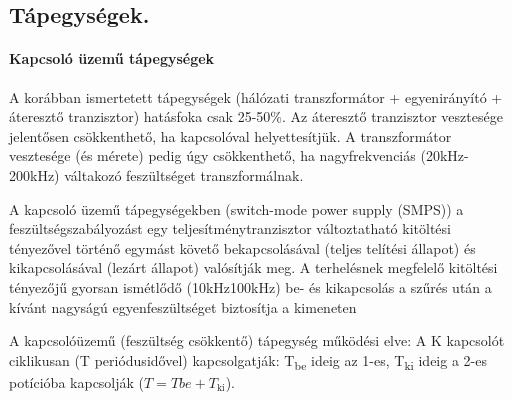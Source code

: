 \subsection{Tápegységek.}
\paragraph{Kapcsoló üzemű tápegységek} A korábban ismertetett tápegységek (hálózati transzformátor + egyenirányító + áteresztő tranzisztor) hatásfoka csak 25-50\%. Az áteresztő tranzisztor vesztesége jelentősen csökkenthető, ha kapcsolóval helyettesítjük. A transzformátor vesztesége (és mérete) pedig úgy csökkenthető, ha nagyfrekvenciás (20kHz-200kHz) váltakozó feszültséget transzformálnak.

A kapcsoló üzemű tápegységekben (switch-mode power supply (SMPS)) a feszültségszabályozást egy teljesítménytranzisztor változtatható kitöltési tényezővel történő egymást követő bekapcsolásával (teljes telítési állapot) és kikapcsolásával (lezárt állapot) valósítják meg. A terhelésnek megfelelő kitöltési tényezőjű gyorsan ismétlődő (10kHz\textendash100kHz) be- és kikapcsolás a szűrés után a kívánt nagyságú egyenfeszültséget biztosítja a kimeneten

A kapcsolóüzemű (feszültség csökkentő) tápegység működési elve: A K kapcsolót ciklikusan (T periódusidővel) kapcsolgatják: T\textsubscript{be} ideig az 1-es, T\textsubscript{ki} ideig a 2-es potícióba kapcsolják ($T=T be +T_\text{ki}$).

